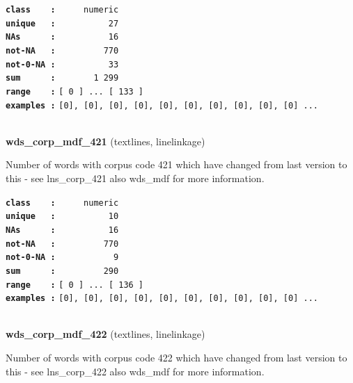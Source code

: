 \documentclass[]{article}
\begin{document}
\textbf{\texttt{class\ \ \ \ :}} \texttt{~~~~~numeric}\\
\textbf{\texttt{unique\ \ \ :}} \texttt{~~~~~~~~~~27}\\
\textbf{\texttt{NAs\ \ \ \ \ \ :}} \texttt{~~~~~~~~~~16}\\
\textbf{\texttt{not-NA\ \ \ :}} \texttt{~~~~~~~~~770}\\
\textbf{\texttt{not-0-NA\ :}} \texttt{~~~~~~~~~~33}\\
\textbf{\texttt{sum\ \ \ \ \ \ :}} \texttt{~~~~~~~1~299}\\
\textbf{\texttt{range\ \ \ \ :}}
\texttt{{[}\ 0\ {]}\ ...\ {[}\ 133\ {]}}\\
\textbf{\texttt{examples\ :}}
\texttt{{[}0{]},\ {[}0{]},\ {[}0{]},\ {[}0{]},\ {[}0{]},\ {[}0{]},\ {[}0{]},\ {[}0{]},\ {[}0{]},\ {[}0{]}\ ...}\\

~

\textbf{wds\_corp\_mdf\_421} (textlines, linelinkage)

Number of words with corpus code 421 which have changed from last
version to this - see lns\_corp\_421 also wds\_mdf for more information.

\textbf{\texttt{class\ \ \ \ :}} \texttt{~~~~~numeric}\\
\textbf{\texttt{unique\ \ \ :}} \texttt{~~~~~~~~~~10}\\
\textbf{\texttt{NAs\ \ \ \ \ \ :}} \texttt{~~~~~~~~~~16}\\
\textbf{\texttt{not-NA\ \ \ :}} \texttt{~~~~~~~~~770}\\
\textbf{\texttt{not-0-NA\ :}} \texttt{~~~~~~~~~~~9}\\
\textbf{\texttt{sum\ \ \ \ \ \ :}} \texttt{~~~~~~~~~290}\\
\textbf{\texttt{range\ \ \ \ :}}
\texttt{{[}\ 0\ {]}\ ...\ {[}\ 136\ {]}}\\
\textbf{\texttt{examples\ :}}
\texttt{{[}0{]},\ {[}0{]},\ {[}0{]},\ {[}0{]},\ {[}0{]},\ {[}0{]},\ {[}0{]},\ {[}0{]},\ {[}0{]},\ {[}0{]}\ ...}\\

~

\textbf{wds\_corp\_mdf\_422} (textlines, linelinkage)

Number of words with corpus code 422 which have changed from last
version to this - see lns\_corp\_422 also wds\_mdf for more information.
\end{document}
